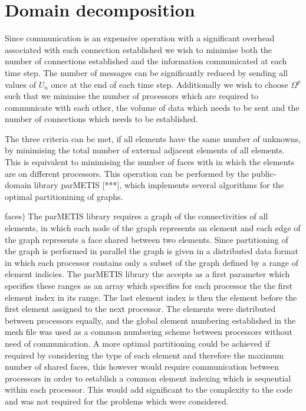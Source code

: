 \section{Domain decomposition}


Since communication is an expensive operation with a significant overhead associated with each connection established we wish to minimise both the number of connections established and the information communicated at each time step. The number of messages can be significantly reduced by sending all values of $U_{n}$ once at the end of each time step.
Additionally we wish to choose $\Omega^p$ such that we minimise the number of processors which are required to communicate with each other, the volume of data which needs to be sent and the number of connections which needs to be established.


The three criteria can be met, if all elements have the same number of unknowns, by minimising the total number of external adjacent elements of all elements. This is equivalent to minimising the number of faces with in which the elements are on different processors. This operation can be performed by the public-domain library parMETIS [***], which implements several algorithms for the optimal partitionining of graphs.

faces)
The parMETIS library requires a graph of the connectivities of all elements, in which each node of the graph represents an element and each edge of the graph represents a face shared between two elements. Since partitioning of the graph is performed in parallel the graph is given in a distributed data format in which each processor contains only a subset of the graph defined by a range of element indicies. The parMETIS library the accepts as a first parameter which specifies these ranges as an array which specifies for each processor the the first element index in its range. The last element index is then the element before the first element assigned to the next processor. The elements were distributed between processors equally, and the global element numbering established in the mesh file was used as a common numbering scheme between processors without need of communication.
A more optimal partitioning could be achieved if required by considering the type of each element and therefore the maximum number of shared faces, this however would require communication between processors in order to establish a common element indexing which is sequential within each processor. This would add significant to the complexity to the code and was not required for the problems which were considered.

